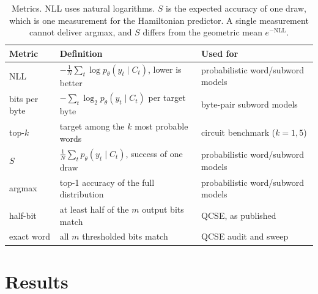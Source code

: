 \documentclass[11pt,a4paper]{article}
\begin{document}
\begin{table}[!tb]
  \centering\small
  \caption{Metrics. NLL uses natural logarithms. $S$ is the expected accuracy of one draw, which is one measurement for the Hamiltonian predictor. A single measurement cannot deliver argmax, and $S$ differs from the geometric mean $e^{-\mathrm{NLL}}$.}
  \label{tab:metrics}
  \begin{tabularx}{\linewidth}{@{}llL@{}}
    \toprule
    Metric     & Definition                                                      & Used for                          \\
    \midrule
    NLL        & $-\frac1N\sum_t\log p_\theta(y_t\mid C_t)$, lower is better     & probabilistic word/subword models \\
    bits per byte & $-\sum_t\log_2 p_\theta(y_t\mid C_t)$ per target byte        & byte-pair subword models          \\
    top-$k$    & target among the $k$ most probable words                        & circuit benchmark ($k=1,5$)       \\
    $S$        & $\frac1N\sum_t p_\theta(y_t\mid C_t)$, success of one draw      & probabilistic word/subword models \\
    argmax     & top-1 accuracy of the full distribution                         & probabilistic word/subword models \\
    half-bit   & at least half of the $m$ output bits match                      & QCSE, as published                \\
    exact word & all $m$ thresholded bits match                                  & QCSE audit and sweep              \\
    \bottomrule
  \end{tabularx}
\end{table}

\section{Results}
\label{sec:results}
\end{document}
